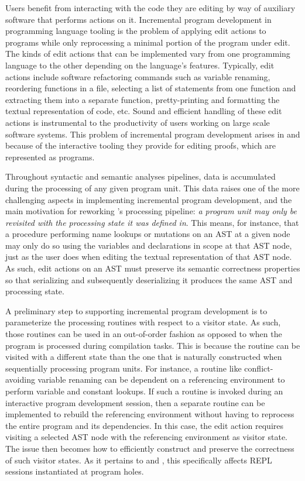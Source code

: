 Users benefit from interacting with the code they are editing by way of auxiliary software that performs actions on it.
Incremental program development in programming language tooling is the problem of applying edit actions to programs while only reprocessing a minimal portion of the program under edit.
The kinds of edit actions that can be implemented vary from one programming language to the other depending on the language's features.
Typically, edit actions include software refactoring commands such as variable renaming, reordering functions in a file, selecting a list of statements from one function and extracting them into a separate function, pretty-printing and formatting the textual representation of code, etc.
Sound and efficient handling of these edit actions is instrumental to the productivity of users working on large scale software systems.
This problem of incremental program development arises in \Beluga and \Harpoon because of the interactive tooling they provide for editing proofs, which are represented as programs.


Throughout syntactic and semantic analyses pipelines, data is accumulated during the processing of any given program unit.
This data raises one of the more challenging aspects in implementing incremental program development, and the main motivation for reworking \Beluga's processing pipeline: \textit{a program unit may only be revisited with the processing state it was defined in}.
This means, for instance, that a procedure performing name lookups or mutations on an \ac{AST} at a given node may only do so using the variables and declarations in scope at that \ac{AST} node, just as the user does when editing the textual representation of that \ac{AST} node.
As such, edit actions on an \ac{AST} must preserve its semantic correctness properties so that serializing and subsequently deserializing it produces the same \ac{AST} and processing state.


A preliminary step to supporting incremental program development is to parameterize the processing routines with respect to a visitor state.
As such, those routines can be used in an out-of-order fashion as opposed to when the program is processed during compilation tasks.
This is because the routine can be visited with a different state than the one that is naturally constructed when sequentially processing program units.
For instance, a routine like conflict-avoiding variable renaming can be dependent on a referencing environment to perform variable and constant lookups.
If such a routine is invoked during an interactive program development session, then a separate routine can be implemented to rebuild the referencing environment without having to reprocess the entire program and its dependencies.
In this case, the edit action requires visiting a selected \ac{AST} node with the referencing environment as visitor state.
The issue then becomes how to efficiently construct and preserve the correctness of such visitor states.
As it pertains to \Beluga and \Harpoon, this specifically affects \ac{REPL} sessions instantiated at program holes.
